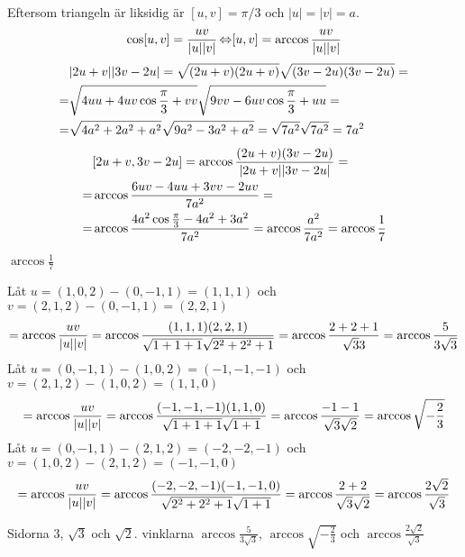 \begin{task}{4.12}
	Eftersom triangeln är liksidig är $[u,v]=\pi/3$ och $|u|=|v|=a$.
	\[\cos[u,v]=\frac{u\*v}{|u||v|} \lra
	[u,v]=\arccos\frac{u\*v}{|u||v|}\]
	\begin{align*}
		&|2u+v||3v-2u|=
		\sqrt{(2u+v)\*(2u+v)}\sqrt{(3v-2u)\*(3v-2u)}= \\ =
		&\sqrt{4u\*u+4u\*v\*\cos\frac{\pi}{3}+v\*v}\sqrt{9v\*v-6u\*v\*\cos\frac{\pi}{3}+u\*u}= \\ =
		&\sqrt{4a^2+2a^2+a^2}\sqrt{9a^2-3a^2+a^2}=
		\sqrt{7a^2}\sqrt{7a^2}=
		7a^2
	\end{align*}
	\begin{align*}
		&[2u+v,3v-2u]=\arccos\frac{(2u+v)\*(3v-2u)}{|2u+v||3v-2u|}= \\ =
		&\arccos\frac{6u\*v-4u\*u+3v\*v-2u\*v}{7a^2}= \\ =
		&\arccos\frac{4a^2\cos\frac{\pi}{3}-4a^2+3a^2}{7a^2}=
		\arccos\frac{a^2}{7a^2}=
		\arccos\frac{1}{7}
	\end{align*}

	\ans $\arccos\frac{1}{7}$
\end{task}

\begin{task}{4.13}
	Låt $u=(1,0,2)-(0,-1,1)=(1,1,1)$ och $v=(2,1,2)-(0,-1,1)=(2,2,1)$
	\begin{align*}
		[u,v]=
		\arccos\frac{u\*v}{|u||v|}=
		\arccos\frac{(1,1,1)\*(2,2,1)}{\sqrt{1+1+1}\sqrt{2^2+2^2+1}}=
		\arccos\frac{2+2+1}{\sqrt{3}3}=
		\arccos\frac{5}{3\sqrt{3}}
	\end{align*}
	Låt $u=(0,-1,1)-(1,0,2)=(-1,-1,-1)$ och $v=(2,1,2)-(1,0,2)=(1,1,0)$
	\begin{align*}
		[u,v]=
		\arccos\frac{u\*v}{|u||v|}=
		\arccos\frac{(-1,-1,-1)\*(1,1,0)}{\sqrt{1+1+1}\sqrt{1+1}}=
		\arccos\frac{-1-1}{\sqrt{3}\sqrt{2}}=
		\arccos\sqrt{-\frac{2}{3}}
	\end{align*}
	Låt $u=(0,-1,1)-(2,1,2)=(-2,-2,-1)$ och $v=(1,0,2)-(2,1,2)=(-1,-1,0)$
	\begin{align*}
		[u,v]=
		\arccos\frac{u\*v}{|u||v|}=
		\arccos\frac{(-2,-2,-1)\*(-1,-1,0)}{\sqrt{2^2+2^2+1}\sqrt{1+1}}=
		\arccos\frac{2+2}{\sqrt{3}\sqrt{2}}=
		\arccos\frac{2\sqrt{2}}{\sqrt{3}}
	\end{align*}

	\ans Sidorna $3$, $\sqrt{3}$ och $\sqrt{2}$. vinklarna $\arccos\frac{5}{3\sqrt{3}}$, $\arccos\sqrt{-\frac{2}{3}}$ och $\arccos\frac{2\sqrt{2}}{\sqrt{3}}$
\end{task}

